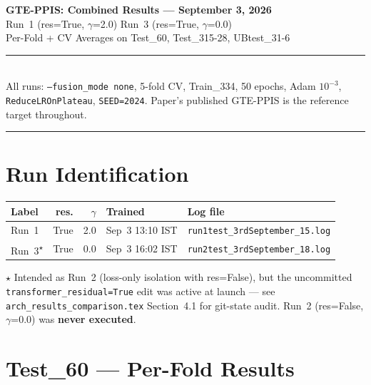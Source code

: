 \documentclass[10pt, a4paper]{article}
\newcommand{\code}[1]{\texttt{\small #1}}
\newcommand{\warn}[1]{\textcolor{warnorange}{\textbf{#1}}}
\begin{document}

\begin{center}
    {\LARGE\bfseries\color{primaryblue}
        GTE-PPIS: Combined Results --- September 3, 2026}\\[4pt]
    {\large\color{secondaryblue}
        Run~1 \textnormal{(res=True, $\gamma$=2.0)} \quad
        Run~3 \textnormal{(res=True, $\gamma$=0.0)}\\
        Per-Fold + CV Averages on Test\_60, Test\_315-28, UBtest\_31-6}\\[6pt]
    \rule{\textwidth}{1pt}\\[3pt]
    {\small All runs: \code{--fusion\_mode none}, 5-fold CV, Train\_334, 50 epochs,
    Adam $10^{-3}$, \code{ReduceLROnPlateau}, \code{SEED=2024}.
    Paper's published GTE-PPIS is the reference target throughout.}
    \rule{\textwidth}{0.5pt}
\end{center}

\section*{Run Identification}

\begin{center}
\footnotesize
\begin{tabular}{LNNLL}
\toprule
\normalsize\textbf{Label} &
\normalsize\textbf{res.} &
\normalsize\textbf{$\gamma$} &
\normalsize\textbf{Trained} &
\normalsize\textbf{Log file} \\
\midrule
Run~1 & True & 2.0 & Sep~3 13:10 IST & \texttt{run1test\_3rdSeptember\_15.log} \\
Run~3\textsuperscript{$\star$} & True & 0.0 & Sep~3 16:02 IST & \texttt{run2test\_3rdSeptember\_18.log} \\
\bottomrule
\end{tabular}
\end{center}

{\footnotesize $\star$ Intended as Run~2 (loss-only isolation with res=False), but the uncommitted
\code{transformer\_residual=True} edit was active at launch --- see \texttt{arch\_results\_comparison.tex}
Section~4.1 for git-state audit. Run~2 (res=False, $\gamma$=0.0) was \warn{never executed}.}

\section{Test\_60 --- Per-Fold Results}
\end{document}
